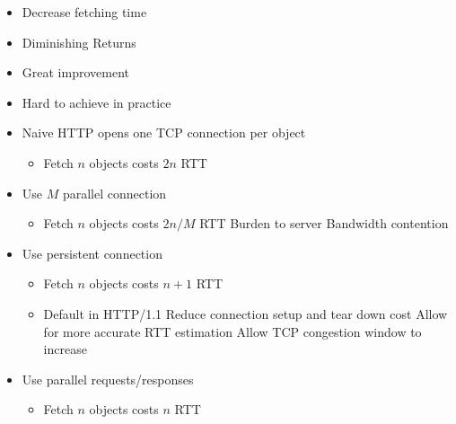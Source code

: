 \begin{itemize}
\begin{itemize}
                \begin{itemize}
                    \item Decrease fetching time
                    \item Diminishing Returns
                \end{itemize}
                \begin{itemize}
                    \item Great improvement
                    \item Hard to achieve in practice
                \end{itemize}
                \begin{itemize}
                    \item Naive HTTP opens one TCP connection per object
                        \begin{itemize}
                            \item Fetch $n$ objects costs $2n$ RTT
                        \end{itemize}
                    \item Use $M$ parallel connection
                        \begin{itemize}
                            \item Fetch $n$ objects costs $2n / M$ RTT
                            \icon Burden to server
                            \icon Bandwidth contention
                        \end{itemize}
                    \item Use persistent connection
                        \begin{itemize}
                            \item Fetch $n$ objects costs $n + 1$ RTT
                            \item Default in HTTP/1.1
                            \ipro Reduce connection setup and tear down cost
                            \ipro Allow for more accurate RTT estimation
                            \ipro Allow TCP congestion window to increase
                        \end{itemize}
                    \item Use parallel requests/responses
                        \begin{itemize}
                            \item Fetch $n$ objects costs $n$ RTT

\end{itemize}
\end{itemize}
\end{itemize}
\end{itemize}
